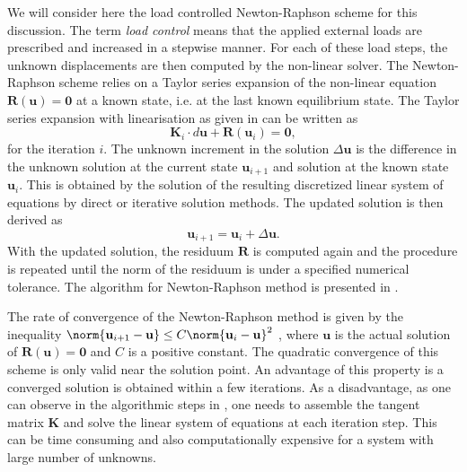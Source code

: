 We will consider here the load controlled Newton-Raphson scheme for this discussion. The term \textit{load control} means that the applied external loads are prescribed and increased in a stepwise manner. For each of these load steps, the unknown displacements are then computed by the non-linear solver. The Newton-Raphson scheme relies on a Taylor series expansion of the non-linear equation $\mathbf{R} (\mathbf{u}) = \bm{0}$ at a known state, i.e. at the last known equilibrium state. The Taylor series expansion with linearisation as given in  can be written as 
\begin{equation}
\mathbf{K}_i \cdot d\mathbf{u} + \mathbf{R}(\mathbf{u}_i) = \bm{0},
\end{equation}
for the iteration $i$. The unknown increment in the solution $\Delta\mathbf{u}$ is the difference in the unknown solution at the current state $\mathbf{u}_{i+1}$ and solution at the known state $\mathbf{u}_i$. This is obtained by the solution of the resulting discretized linear system of equations by direct or iterative solution methods. The updated solution is then derived as 
\begin{equation}
\mathbf{u}_{i+1} = \mathbf{u}_i + \Delta\mathbf{u}.
\end{equation}
With the updated solution, the residuum $\mathbf{R}$ is computed again and the procedure is repeated until the norm of the residuum is under a specified numerical tolerance. The algorithm for Newton-Raphson method is presented in . \par 

The rate of convergence of the Newton-Raphson method is given by the inequality $\norm{\mathbf{u}_{i+1} - \mathbf{u}} \leq C \norm{\mathbf{u}_i - \mathbf{u}}^2$ \cite{Wriggers2008}, where $\mathbf{u}$ is the actual solution of $\mathbf{R}(\mathbf{u}) = \mathbf{0}$ and $C$ is a positive constant. The quadratic convergence of this scheme is only valid near the solution point. An advantage of this property is a converged solution is obtained within a few iterations. As a disadvantage, as one can observe in the algorithmic steps in , one needs to assemble the tangent matrix $\mathbf{K}$ and solve the linear system of equations at each iteration step. This can be time consuming and also computationally expensive for a system with large number of unknowns. \par 

